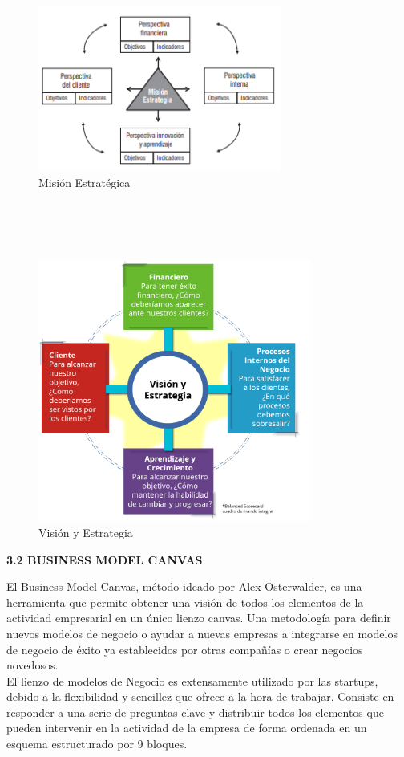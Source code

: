 \documentclass[a4paper,12pt,twocolumn]{article}
\begin{document}
\begin{figure}[h!]
\centering
\includegraphics[width=8cm]{./Imagenes/img2}
\caption{\label{fig:01}Misión Estratégica}
\end{figure}

\\
\textbf{}
\\
\\
\begin{figure}[h!]
\centering
\includegraphics[width=9cm]{./Imagenes/img4}
\caption{\label{fig:01}Visión y Estrategia}
\end{figure}

\textbf{3.2 BUSINESS MODEL CANVAS}
\item{El Business Model Canvas, método ideado por Alex Osterwalder, es una herramienta que permite obtener una visión de todos los elementos de la actividad empresarial en un único lienzo canvas. Una metodología para definir nuevos modelos de negocio o ayudar a nuevas empresas a integrarse en modelos de negocio de éxito ya establecidos por otras compañías o crear negocios novedosos.
\\
El lienzo de modelos de Negocio es extensamente utilizado por las startups, debido a la flexibilidad y sencillez que ofrece a la hora de trabajar. Consiste en responder a una serie de preguntas clave y distribuir todos los elementos que pueden intervenir en la actividad de la empresa de forma ordenada en un esquema estructurado por 9 bloques.}
\end{document}
